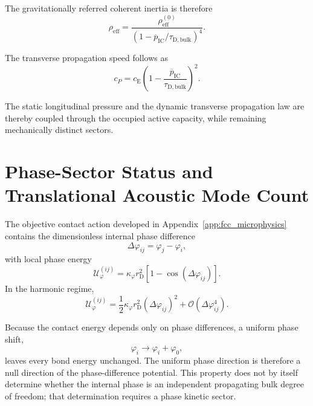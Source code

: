 The gravitationally referred coherent inertia is therefore
\begin{equation}
    \rho_{\mathrm{eff}} = \frac{\rho_{\mathrm{eff}}^{(0)}}{ \left( 1- \overline{p}_{\mathrm{IC}} / \tau_{\mathrm{D,bulk}} \right)^4 }.
\end{equation}

The transverse propagation speed follows as
\begin{equation}
    \boxed{ c_P = c_{\mathrm{E}} \left( 1- \frac{\overline{p}_{\mathrm{IC}}}{\tau_{\mathrm{D,bulk}}} \right)^2 }.
\end{equation}

The static longitudinal pressure and the dynamic transverse propagation law are thereby coupled through the occupied active capacity, while remaining mechanically distinct sectors.

\section{Phase-Sector Status and Translational Acoustic Mode Count}
\label{sec:AP_phase_status}

The objective contact action developed in Appendix~\ref{app:fcc_microphysics} contains the dimensionless internal phase difference
\begin{equation}
    \Delta\varphi_{ij}=\varphi_j-\varphi_i,
\end{equation}
with local phase energy
\begin{equation}
    \mathcal U_{\varphi}^{(ij)}
    =
    \kappa_{\varphi}r_{\mathrm D}^2
    \left[1-\cos(\Delta\varphi_{ij})\right].
\end{equation}
In the harmonic regime,
\begin{equation}
    \mathcal U_{\varphi}^{(ij)}
    =
    \frac{1}{2}\kappa_{\varphi}r_{\mathrm D}^2
    (\Delta\varphi_{ij})^2
    +\mathcal O(\Delta\varphi_{ij}^4).
\end{equation}

Because the contact energy depends only on phase differences, a uniform phase shift,
\begin{equation}
    \varphi_i\rightarrow\varphi_i+\varphi_0,
\end{equation}
leaves every bond energy unchanged. The uniform phase direction is therefore a null direction of the phase-difference potential. This property does not by itself determine whether the internal phase is an independent propagating bulk degree of freedom; that determination requires a phase kinetic sector.

